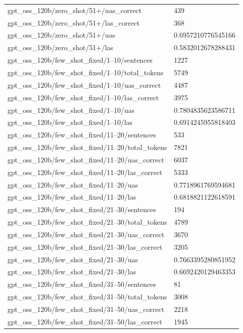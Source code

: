 \begin{tabular}{ll}
gpt\_oss\_120b/zero\_shot/51+/uas\_correct & 439 \\
gpt\_oss\_120b/zero\_shot/51+/las\_correct & 368 \\
gpt\_oss\_120b/zero\_shot/51+/uas & 0.6957210776545166 \\
gpt\_oss\_120b/zero\_shot/51+/las & 0.5832012678288431 \\
gpt\_oss\_120b/few\_shot\_fixed/1–10/sentences & 1227 \\
gpt\_oss\_120b/few\_shot\_fixed/1–10/total\_tokens & 5749 \\
gpt\_oss\_120b/few\_shot\_fixed/1–10/uas\_correct & 4487 \\
gpt\_oss\_120b/few\_shot\_fixed/1–10/las\_correct & 3975 \\
gpt\_oss\_120b/few\_shot\_fixed/1–10/uas & 0.7804835623586711 \\
gpt\_oss\_120b/few\_shot\_fixed/1–10/las & 0.6914245955818403 \\
gpt\_oss\_120b/few\_shot\_fixed/11–20/sentences & 533 \\
gpt\_oss\_120b/few\_shot\_fixed/11–20/total\_tokens & 7821 \\
gpt\_oss\_120b/few\_shot\_fixed/11–20/uas\_correct & 6037 \\
gpt\_oss\_120b/few\_shot\_fixed/11–20/las\_correct & 5333 \\
gpt\_oss\_120b/few\_shot\_fixed/11–20/uas & 0.7718961769594681 \\
gpt\_oss\_120b/few\_shot\_fixed/11–20/las & 0.6818821122618591 \\
gpt\_oss\_120b/few\_shot\_fixed/21–30/sentences & 194 \\
gpt\_oss\_120b/few\_shot\_fixed/21–30/total\_tokens & 4789 \\
gpt\_oss\_120b/few\_shot\_fixed/21–30/uas\_correct & 3670 \\
gpt\_oss\_120b/few\_shot\_fixed/21–30/las\_correct & 3205 \\
gpt\_oss\_120b/few\_shot\_fixed/21–30/uas & 0.7663395280851952 \\
gpt\_oss\_120b/few\_shot\_fixed/21–30/las & 0.6692420129463353 \\
gpt\_oss\_120b/few\_shot\_fixed/31–50/sentences & 81 \\
gpt\_oss\_120b/few\_shot\_fixed/31–50/total\_tokens & 3008 \\
gpt\_oss\_120b/few\_shot\_fixed/31–50/uas\_correct & 2218 \\
gpt\_oss\_120b/few\_shot\_fixed/31–50/las\_correct & 1945 \\

\end{tabular}
